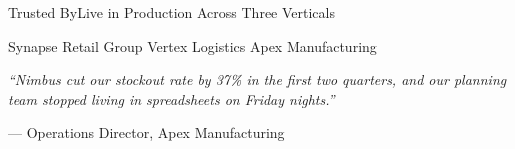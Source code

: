\begin{frame}{Trusted By}{Live in Production Across Three Verticals}

  \centering
  \vspace{0.2cm}
  {\large
    \textcolor{textLight}{Synapse Retail Group} \quad\textcolor{textMuted}{\textbullet}\quad
    \textcolor{textLight}{Vertex Logistics} \quad\textcolor{textMuted}{\textbullet}\quad
    \textcolor{textLight}{Apex Manufacturing}
  }

  \vspace{0.6cm}

  \begin{minipage}{0.85\textwidth}
    \begin{quotebox}
      \textcolor{accentViolet}{\Large\faQuoteLeft}

      \vspace{0.15cm}
      \textit{``Nimbus cut our stockout rate by 37\% in the first two quarters, and our
      planning team stopped living in spreadsheets on Friday nights.''}

      \vspace{0.2cm}
      {\small\textcolor{textMuted}{--- Operations Director, Apex Manufacturing \cite{apex2026case}}}
    \end{quotebox}
  \end{minipage}

\end{frame}

